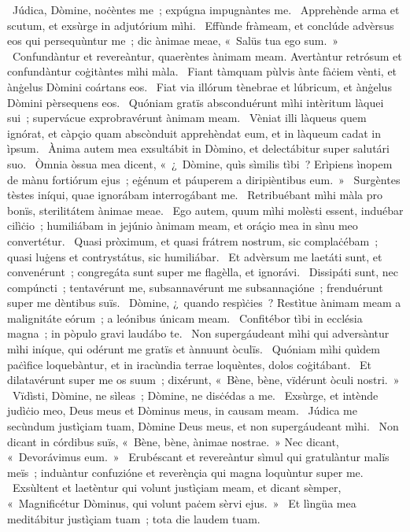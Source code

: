 \psalmChapterWithInscription{}
{ }
{%
~Júdica, Dòmine, noċèntes me~; expúgna impugnàntes me. 
~Apprehènde arma et scutum, et exsùrge in adjutórium mìhi. 
~Effùnde fràmeam, et conclúde advèrsus eos qui persequùntur me~; dic ànimae meae, «~Salüs tua ego sum.~»
~Confundàntur et revereàntur, quaerèntes ànimam meam. Avertàntur retrósum et confundàntur coġitàntes mìhi màla. 
~Fiant tàmquam pùlvis ànte fàċiem vènti, et ànġelus Dòmini coártans eos. 
~Fiat via illórum tènebrae et lúbricum, et ànġelus Dòmini pèrsequens eos. 
~Quóniam gratïs absconduérunt mìhi intèritum làquei sui~; supervácue exprobravérunt ànimam meam. 
~Vèniat illi làqueus quem ignórat, et càpçio quam abscònduit apprehèndat eum, et in làqueum cadat in ìpsum. 
~Ànima autem mea exsultábit in Dòmino, et delectábitur super salutári suo. 
~Òmnia òssua mea dicent, «~¿~Dòmine, quìs sìmilis tìbi~? Erìpiens ìnopem de mànu fortiórum ejus~; eġénum et páuperem a diripièntibus eum.~» 
~Surgèntes tèstes iníqui, quae ignorábam interrogábant me. 
~Retribuébant mìhi màla pro bonïs, sterilitátem ànimae meae. 
~Ego autem, quum mìhi molèsti essent, induébar cilìċio~; humiliábam in jejúnio ànimam meam, et oráçio mea in sìnu meo convertétur. 
~Quasi pròximum, et quasi frátrem nostrum, sic complaċébam~; quasi luġens et contrystátus, sic humiliábar. 
~Et advèrsum me laetáti sunt, et convenérunt~; congregáta sunt super me flagèlla, et ignorávi. 
~Dissipáti sunt, nec compúncti~; tentavérunt me, subsannavérunt me subsannaçióne~; frenduérunt super me dèntibus suïs. 
~Dòmine, ¿~quando respìċies~? Restìtue ànimam meam a malignitáte eórum~; a leónibus únicam meam. 
~Confitébor tìbi in ecclésia magna~; in pòpulo gravi laudábo te. 
~Non supergáudeant mìhi qui adversàntur mìhi iníque, qui odérunt me gratïs et ànnuunt òculïs. 
~Quóniam mìhi quìdem paċìfice loquebàntur, et in iracùndia terrae loquèntes, dolos coġitábant. 
~Et dilatavérunt super me os suum~; dixérunt, «~Bène, bène, vïdérunt òculi nostri.~»
~Vïdìsti, Dòmine, ne sìleas~; Dòmine, ne disċédas a me. 
~Exsùrge, et intènde judìċio meo, Deus meus et Dòminus meus, in causam meam. 
~Júdica me secùndum justìçiam tuam, Dòmine Deus meus, et non supergáudeant mìhi. 
~Non dicant in córdibus suïs, «~Bène, bène, ànimae nostrae.~» Nec dicant, «~Devorávimus eum.~»
~Erubéscant et revereàntur sìmul qui gratulàntur malïs meïs~; induàntur confuzióne et reverènçia qui magna loquùntur super me. 
~Exsùltent et laetèntur qui volunt justìçiam meam, et dicant sèmper, «~Magnificétur Dòminus, qui volunt paċem sèrvi ejus.~»
~Et lìngüa mea meditábitur justìçiam tuam~; tota die laudem tuam. 
}
